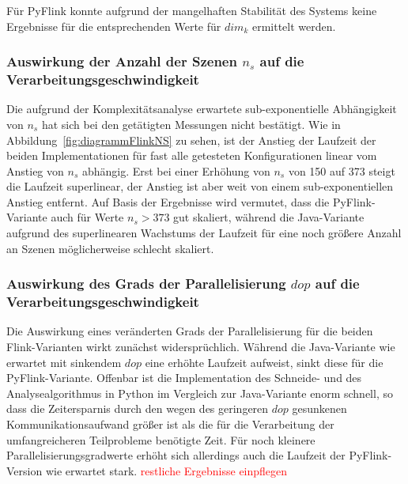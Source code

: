 Für PyFlink konnte aufgrund der mangelhaften Stabilität des Systems keine Ergebnisse für die entsprechenden Werte für $dim_k$ ermittelt werden. 

\subsubsection{Auswirkung der Anzahl der Szenen $n_s$ auf die Verarbeitungsgeschwindigkeit}
Die aufgrund der Komplexitätsanalyse erwartete sub-exponentielle Abhängigkeit von $n_s$ hat sich bei den getätigten Messungen nicht bestätigt. Wie in Abbildung~\ref{fig:diagrammFlinkNS} zu sehen, ist der Anstieg der Laufzeit der beiden Implementationen für fast alle getesteten Konfigurationen linear vom Anstieg von $n_s$ abhängig. Erst bei einer Erhöhung von $n_s$ von 150 auf 373 steigt die Laufzeit superlinear, der Anstieg ist aber weit von einem sub-exponentiellen Anstieg entfernt. Auf Basis der Ergebnisse wird vermutet, dass die PyFlink-Variante auch für Werte $n_s > 373$ gut skaliert, während die Java-Variante aufgrund des superlinearen Wachstums der Laufzeit für eine noch größere Anzahl an Szenen möglicherweise schlecht skaliert. 

\subsubsection{Auswirkung des Grads der Parallelisierung $dop$ auf die Verarbeitungsgeschwindigkeit}
Die Auswirkung eines veränderten Grads der Parallelisierung für die beiden Flink-Varianten wirkt zunächst widersprüchlich. Während die Java-Variante wie erwartet mit sinkendem $dop$ eine erhöhte Laufzeit aufweist, sinkt diese für die PyFlink-Variante. Offenbar ist die Implementation des Schneide- und des Analysealgorithmus in Python im Vergleich zur Java-Variante enorm schnell, so dass die Zeitersparnis durch den wegen des geringeren $dop$ gesunkenen Kommunikationsaufwand größer ist als die für die Verarbeitung der umfangreicheren Teilprobleme benötigte Zeit. Für noch kleinere Parallelisierungsgradwerte erhöht sich allerdings auch die Laufzeit der PyFlink-Version wie erwartet stark. \textcolor{red}{restliche Ergebnisse einpflegen}

